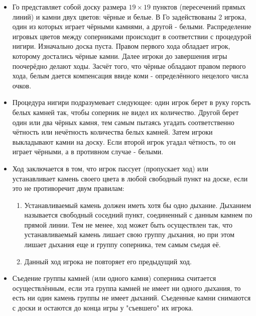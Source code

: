 \begin{itemize}

\item Го представляет собой доску размера $19 \times 19$ пунктов (пересечений прямых линий) и камни двух цветов: чёрные и белые. В Го задействованы 2 игрока, один из которых играет чёрными камнями, а другой - белыми. Распределение игровых цветов между соперниками происходит в соответствии с процедурой нигири. Изначально доска пуста. Правом первого хода обладает игрок, которому достались чёрные камни. Далее игроки до завершения игры поочерёдно делают ходы. Засчёт того, что чёрные обладают правом первого хода, белым дается компенсация ввиде коми - определённого нецелого числа очков.\\

\item Процедура нигири подразумевает следующее: один игрок берет в руку горсть белых камней так, чтобы соперник не видел их количество. Другой берет один или два чёрных камня, тем самым пытаясь угадать соответственно чётность или нечётность количества белых камней. Затем игроки выкладывают камни на доску. Если второй игрок угадал чётность, то он играет чёрными, а в противном случае - белыми.\\

\item Ход заключается в том, что игрок пассует (пропускает ход) или устанавливает камень своего цвета в любой свободный пункт на доске, если это не противоречит двум правилам:
  \begin{enumerate}
  
  \item Устанавливаемый камень должен иметь хотя бы одно дыхание. Дыханием называется свободный соседний пункт, соединенный с данным камнем по прямой линии. Тем не менее, ход может быть осуществлен так, что устанавливаемый камень лишает свою группу дыхания, но при этом лишает дыхания еще и группу соперника, тем самым съедая её.\\
 
  \item  Данный ход игрока не повторяет его предыдущий ход.\\
  
  \end{enumerate}

\item Съедение группы камней (или одного камня) соперника считается осуществлённым, если эта группа камней не имеет
    ни одного дыхания, то есть ни один камень группы не имеет дыханий. Съеденные камни снимаются с доски и остаются до
    конца игры у "съевшего" их игрока.\\
    

\end{itemize}
